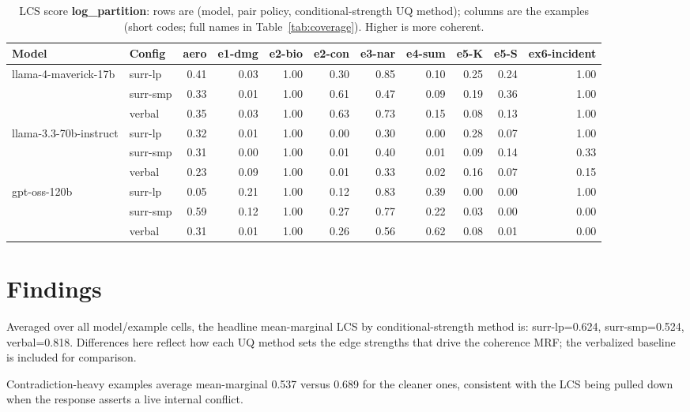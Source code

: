 \documentclass[11pt]{article}
\begin{document}
\begin{table}[htbp]
\centering
\footnotesize
\setlength{\tabcolsep}{3.5pt}
\caption{LCS score \textbf{log\_partition}: rows are (model, pair policy, conditional-strength UQ method); columns are the examples (short codes; full names in Table~\ref{tab:coverage}). Higher is more coherent.}
\label{tab:log-partition}
\begin{tabular}{llrrrrrrrrr}
\toprule
\textbf{Model} & \textbf{Config} & \textbf{aero} & \textbf{e1-dmg} & \textbf{e2-bio} & \textbf{e2-con} & \textbf{e3-nar} & \textbf{e4-sum} & \textbf{e5-K} & \textbf{e5-S} & \textbf{ex6-incident} \\
\midrule
llama-4-maverick-17b & surr-lp & 0.41 & 0.03 & 1.00 & 0.30 & 0.85 & 0.10 & 0.25 & 0.24 & 1.00 \\
 & surr-smp & 0.33 & 0.01 & 1.00 & 0.61 & 0.47 & 0.09 & 0.19 & 0.36 & 1.00 \\
 & verbal & 0.35 & 0.03 & 1.00 & 0.63 & 0.73 & 0.15 & 0.08 & 0.13 & 1.00 \\
\midrule
llama-3.3-70b-instruct & surr-lp & 0.32 & 0.01 & 1.00 & 0.00 & 0.30 & 0.00 & 0.28 & 0.07 & 1.00 \\
 & surr-smp & 0.31 & 0.00 & 1.00 & 0.01 & 0.40 & 0.01 & 0.09 & 0.14 & 0.33 \\
 & verbal & 0.23 & 0.09 & 1.00 & 0.01 & 0.33 & 0.02 & 0.16 & 0.07 & 0.15 \\
\midrule
gpt-oss-120b & surr-lp & 0.05 & 0.21 & 1.00 & 0.12 & 0.83 & 0.39 & 0.00 & 0.00 & 1.00 \\
 & surr-smp & 0.59 & 0.12 & 1.00 & 0.27 & 0.77 & 0.22 & 0.03 & 0.00 & 0.00 \\
 & verbal & 0.31 & 0.01 & 1.00 & 0.26 & 0.56 & 0.62 & 0.08 & 0.01 & 0.00 \\
\bottomrule
\end{tabular}
\end{table}


\section{Findings}

Averaged over all model/example cells, the headline mean-marginal LCS by conditional-strength method is: surr-lp=0.624, surr-smp=0.524, verbal=0.818. Differences here reflect how each UQ method sets the edge strengths that drive the coherence MRF; the verbalized baseline is included for comparison.

Contradiction-heavy examples average mean-marginal 0.537 versus 0.689 for the cleaner ones, consistent with the LCS being pulled down when the response asserts a live internal conflict.
\end{document}
